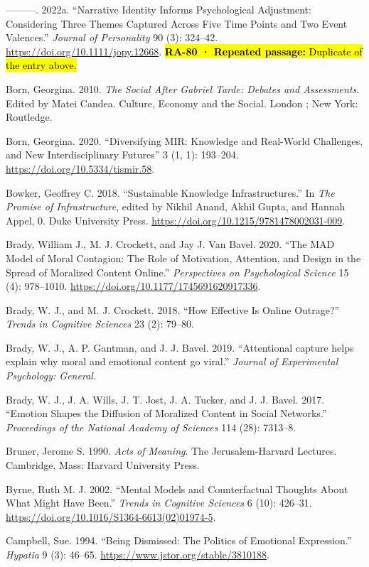 \documentclass[
  letterpaper,
  DIV=11,
  numbers=noendperiod]{scrartcl}
\theoremstyle{remark}
\begin{document}
---------. 2022a. ``Narrative Identity Informs Psychological Adjustment:
Considering Three Themes Captured Across Five Time Points and Two Event
Valences.'' \emph{Journal of Personality} 90 (3): 324--42.
\url{https://doi.org/10.1111/jopy.12668}. \hl{\textbf{RA-80 · Repeated
passage:} Duplicate of the entry above.}

Born, Georgina. 2010. \emph{The Social After Gabriel Tarde: Debates and
Assessments}. Edited by Matei Candea. Culture, Economy and the Social.
London ; New York: Routledge.

Born, Georgina. 2020. ``Diversifying MIR: Knowledge and Real-World
Challenges, and New Interdisciplinary Futures'' 3 (1, 1): 193--204.
\url{https://doi.org/10.5334/tismir.58}.

Bowker, Geoffrey C. 2018. ``Sustainable Knowledge Infrastructures.'' In
\emph{The Promise of Infrastructure}, edited by Nikhil Anand, Akhil
Gupta, and Hannah Appel, 0. Duke University Press.
\url{https://doi.org/10.1215/9781478002031-009}.

Brady, William J., M. J. Crockett, and Jay J. Van Bavel. 2020. ``The MAD
Model of Moral Contagion: The Role of Motivation, Attention, and Design
in the Spread of Moralized Content Online.'' \emph{Perspectives on
Psychological Science} 15 (4): 978--1010.
\url{https://doi.org/10.1177/1745691620917336}.

Brady, W. J., and M. J. Crockett. 2018. ``How Effective Is Online
Outrage?'' \emph{Trends in Cognitive Sciences} 23 (2): 79--80.

Brady, W. J., A. P. Gantman, and J. J. Bavel. 2019. ``Attentional
capture helps explain why moral and emotional content go viral.''
\emph{Journal of Experimental Psychology: General}.

Brady, W. J., J. A. Wills, J. T. Jost, J. A. Tucker, and J. J. Bavel.
2017. ``Emotion Shapes the Diffusion of Moralized Content in Social
Networks.'' \emph{Proceedings of the National Academy of Sciences} 114
(28): 7313--8.

Bruner, Jerome S. 1990. \emph{Acts of Meaning}. The Jerusalem-Harvard
Lectures. Cambridge, Mass: Harvard University Press.

Byrne, Ruth M. J. 2002. ``Mental Models and Counterfactual Thoughts
About What Might Have Been.'' \emph{Trends in Cognitive Sciences} 6
(10): 426--31. \url{https://doi.org/10.1016/S1364-6613(02)01974-5}.

Campbell, Sue. 1994. ``Being Dismissed: The Politics of Emotional
Expression.'' \emph{Hypatia} 9 (3): 46--65.
\url{https://www.jstor.org/stable/3810188}.
\end{document}
